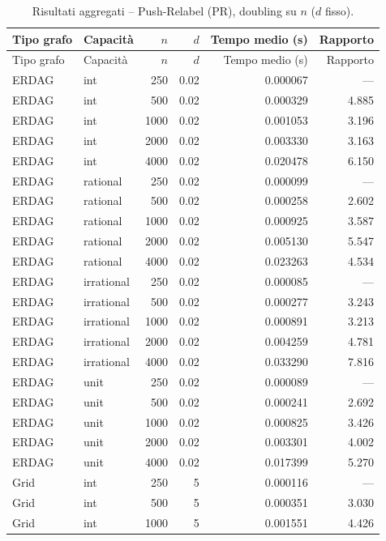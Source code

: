 \begin{longtable}{l l r r r r}
\caption{Risultati aggregati -- Push-Relabel (PR), doubling su $n$ ($d$ fisso).}
\label{tab:pr_results} \\
\toprule
Tipo grafo & Capacit\`a & $n$ & $d$ & Tempo medio (s) & Rapporto \\
\midrule
\endfirsthead
\toprule
Tipo grafo & Capacit\`a & $n$ & $d$ & Tempo medio (s) & Rapporto \\
\midrule
\endhead
\bottomrule
\endfoot
ERDAG & int & 250 & 0.02 & 0.000067 & --- \\
ERDAG & int & 500 & 0.02 & 0.000329 & 4.885 \\
ERDAG & int & 1000 & 0.02 & 0.001053 & 3.196 \\
ERDAG & int & 2000 & 0.02 & 0.003330 & 3.163 \\
ERDAG & int & 4000 & 0.02 & 0.020478 & 6.150 \\
\addlinespace
ERDAG & rational & 250 & 0.02 & 0.000099 & --- \\
ERDAG & rational & 500 & 0.02 & 0.000258 & 2.602 \\
ERDAG & rational & 1000 & 0.02 & 0.000925 & 3.587 \\
ERDAG & rational & 2000 & 0.02 & 0.005130 & 5.547 \\
ERDAG & rational & 4000 & 0.02 & 0.023263 & 4.534 \\
\addlinespace
ERDAG & irrational & 250 & 0.02 & 0.000085 & --- \\
ERDAG & irrational & 500 & 0.02 & 0.000277 & 3.243 \\
ERDAG & irrational & 1000 & 0.02 & 0.000891 & 3.213 \\
ERDAG & irrational & 2000 & 0.02 & 0.004259 & 4.781 \\
ERDAG & irrational & 4000 & 0.02 & 0.033290 & 7.816 \\
\addlinespace
ERDAG & unit & 250 & 0.02 & 0.000089 & --- \\
ERDAG & unit & 500 & 0.02 & 0.000241 & 2.692 \\
ERDAG & unit & 1000 & 0.02 & 0.000825 & 3.426 \\
ERDAG & unit & 2000 & 0.02 & 0.003301 & 4.002 \\
ERDAG & unit & 4000 & 0.02 & 0.017399 & 5.270 \\
\addlinespace
Grid & int & 250 & 5 & 0.000116 & --- \\
Grid & int & 500 & 5 & 0.000351 & 3.030 \\
Grid & int & 1000 & 5 & 0.001551 & 4.426 \\

\end{longtable}
